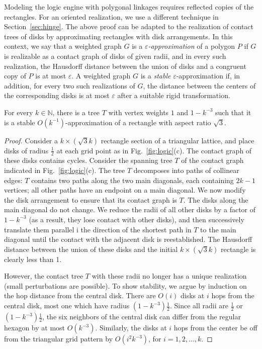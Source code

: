 \documentclass{llncs}
\begin{document}
Modeling the logic engine with polygonal linkages requires reflected copies of the rectangles. For an oriented realization, we use a different technique in Section~\ref{sec:hinge}. The above proof can be adapted to the realization of contact trees of disks by approximating rectangles with disk arrangements. In this context,
we say that a weighted graph $G$ is a \emph{$\varepsilon$-approximation} of a polygon $P$ if
$G$ is realizable as a contact graph of disks of given radii, and in every such realization,
the Hausdorff distance between the union of disks and a congruent copy of $P$ is at most $\varepsilon$.
A weighted graph $G$ is a \emph{stable} $\varepsilon$-approximation if, in addition,
for every two such realizations of $G$, the distance between the centers of the corresponding
disks is at most $\varepsilon$ after a suitable rigid transformation.

\begin{lemma}\label{lem:approx1}
For every $k\in \mathbb{N}$, there is a tree $T$ with vertex weights $1$ and $1-k^{-3}$ such that
it is a stable $O(k^{-1})$-approximation of a rectangle with aspect ratio $\sqrt{3}$.
\end{lemma}
\begin{proof}
Consider a $k \times (\sqrt{3}k)$ rectangle section of a triangular lattice, and place disks of radius $\frac{1}{2}$ at each grid point as in Fig.~\ref{fig:logic}(c). The contact graph of these disks contains cycles. Consider the spanning tree $T$ of the contact graph indicated in Fig.~\ref{fig:logic}(c). The tree $T$ decomposes into paths of collinear edges: $T$ contains two paths along the two main diagonals, each containing $2k-1$ vertices; all other paths have an endpoint on a main diagonal. We now modify the disk arrangement to ensure that its contact graph is $T$. The disks along the main diagonal do not change. We reduce the radii of all other disks by a factor of $1-k^{-3}$ (as a result, they lose contact with other disks), and then  successively translate them parallel
i the direction of the shortest path in $T$ to the main diagonal until the contact with the adjacent disk is reestablished. The Hausdorff distance between the union of these disks and the initial $k \times (\sqrt{3}k)$
rectangle is clearly less than 1.

However, the contact tree $T$ with these radii no longer has a unique realization (small perturbations are possible). To show stability, we argue by induction on the hop distance from the central disk. There are $O(i)$ disks at $i$ hops from the central disk, most one which have radius $(1-k^{-3})\frac{1}{2}$. Since all radii are $\frac{1}{2}$ or $(1-k^{-3})\frac{1}{2}$, the six neighbors of the central disk can differ from the regular hexagon by at most $O(k^{-3})$.  Similarly, the disks at $i$ hops from the center be off from the triangular grid pattern by
$O(i^2 k^{-3})$, for $i=1,2,\ldots , k$.
\end{proof}
\end{document}
